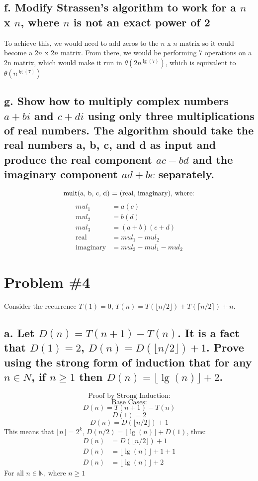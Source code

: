 \documentclass{article}
\newcommand {\N}{\mathbb{N}}
\begin{document}
    \subsection*{f. Modify Strassen's algorithm to work for a \(n\) x \(n\), where \(n\) is not an exact power of 2}
    To achieve this, we would need to add zeros to the \(n\) x \(n\) matrix so it could become a \(2n\) x \(2n\) matrix.
    From there, we would be performing 7 operations on a 2n matrix, which would make it run in \(\theta(2n^{\lg{(7)}})\), which is equivalent to \(\theta(n^{\lg{(7)}})\)
    \subsection*{g. Show how to multiply complex numbers \(a + bi\) and \(c + di\) using only three multiplications of real numbers.
      The algorithm should take the real numbers a, b, c, and d as input and produce the real component \(ac - bd\)
      and the imaginary component \(ad + bc\) separately.
    }
    \[
    \text{mult(a, b, c, d) = (real, imaginary)\text{, where:}}  
    \]
    \begin{align*}
      mul_{1} &= a(c) \\
      mul_{2} &= b(d) \\
      mul_{3} &= (a+b)(c+d) \\
      \text{real} &= mul_{1} - {mul_2} \\
      \text{imaginary} &= mul_{3} - {mul_1} - mul_{2}
    \end{align*}
    \section*{Problem \#4}
    Consider the recurrence \(T(1) = 0\), \(T(n) = T(\lfloor n/2 \rfloor) + T(\lceil n/2 \rceil) + n\).
    \subsection*{a. Let \(D(n) = T(n + 1) - T(n)\). It is a fact that \(D(1) = 2\), \(D(n) = D(\lfloor n/2 \rfloor) + 1\). Prove using the strong
    form of induction that for any \(n \in N\), if \(n \geq 1\) then \(D(n) = \lfloor \lg{(n)}\rfloor + 2\).}
    \[\text{Proof by Strong Induction:}\]
    \[\text{Base Cases:}\]
    \[D(n) = T(n + 1) - T(n)\]
    \[D(1) = 2\]
    \[D(n) = D(\lfloor n/2 \rfloor) + 1\]
    This means that \(\lfloor n \rfloor = 2^k\), \(D(n/2) = \lfloor\lg{(n)}\rfloor + D(1)\), thus:
    \begin{align*}
      D(n) &= D(\lfloor n/2 \rfloor) + 1 \\
      D(n) &= \lfloor\lg{(n)}\rfloor + 1 + 1 \\
      D(n) &= \lfloor\lg{(n)}\rfloor + 2
    \end{align*}
    For all \(n \in \N\), where \(n \geq 1\)
\end{document}

